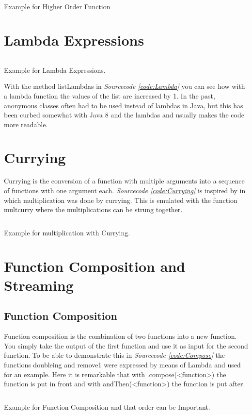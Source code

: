 \documentclass[a4paper,12pt,twoside]{scrreprt}
\begin{document}
\begin{listing}[ht]
    \inputminted[fontsize=\footnotesize,linenos,breaklines,breakanywhere]{java}{./code/HigherOrderFunctions.java}
    \caption[Example for Higher Order Function]{Example for Higher Order Function}
    \label{code:higherordered}
\end{listing}

\section{Lambda Expressions}
\begin{listing}[ht]
    \inputminted[fontsize=\footnotesize,linenos]{java}{./code/Lambda.java}
    \caption[Example for Lambda]{Example for Lambda Expressions.}
    \label{code:Lambda}
\end{listing}
With the method listLambdas in \emph{Sourcecode \ref{code:Lambda}} you can see how with a lambda function the values of the list are increased by 1. In the past, anonymous classes often had to be used instead of lambdas in Java, but this has been curbed somewhat with Java 8 and the lambdas and usually makes the code more readable.
\clearpage
\section{Currying}
Currying is the conversion of a function with multiple arguments into a sequence of functions with one argument each. \emph{Sourcecode \ref{code:Currying}} is inspired by \cite{Robertson_currying_2018} in which multiplication was done by currying. This is emulated with the function multcurry where the multiplications can be strung together.
\begin{listing}[ht]
    \inputminted[fontsize=\footnotesize,linenos]{java}{./code/Currying.java}
    \caption[Example for Currying]{Example for multiplication with Currying.}
    \label{code:Currying}
\end{listing}
\clearpage

\section{Function Composition and Streaming}
\subsection{Function Composition}
Function composition is the combination of two functions into a new function. You simply take the output of the first function and use it as input for the second function. To be able to demonstrate this in \emph{Sourcecode \ref{code:Compose}} the functions doubleing and remove1 were expressed by means of Lambda and used for an example. Here it is remarkable that with .compose(<function>) the function is put in front and with andThen(<function>) the function is put after.
\begin{listing}[ht]
    \inputminted[fontsize=\footnotesize,linenos,breaklines]{java}{./code/FunctionComposition.java}
    \caption[Example for Function Composition]{Example for Function Composition and that order can be Important.}
    \label{code:Compose}
\end{listing}
\clearpage
\end{document}
